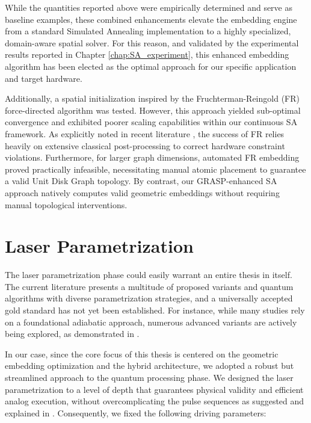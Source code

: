 While the quantities reported above were empirically determined and serve as baseline examples, these combined enhancements elevate the embedding engine from a standard Simulated Annealing implementation to a highly specialized, domain-aware spatial solver. For this reason, and validated by the experimental results reported in Chapter \ref{chap:SA_experiment}, this enhanced embedding algorithm has been elected as the optimal approach for our specific application and target hardware.

Additionally, a spatial initialization inspired by the Fruchterman-Reingold (FR) force-directed algorithm was tested. However, this approach yielded sub-optimal convergence and exhibited poorer scaling capabilities within our continuous SA framework. As explicitly noted in recent literature \cite{tarquini2026dronedeliverypackingproblem}, the success of FR relies heavily on extensive classical post-processing to correct hardware constraint violations. Furthermore, for larger graph dimensions, automated FR embedding proved practically infeasible, necessitating manual atomic placement to guarantee a valid Unit Disk Graph topology. By contrast, our GRASP-enhanced SA approach natively computes valid geometric embeddings without requiring manual topological interventions.

\section{Laser Parametrization}

The laser parametrization phase could easily warrant an entire thesis in itself. The current literature presents a multitude of proposed variants and quantum algorithms with diverse parametrization strategies, and a universally accepted gold standard has not yet been established. For instance, while many studies rely on a foundational adiabatic approach, numerous advanced variants are actively being explored, as demonstrated in \cite{perron2026leveraging}. 

In our case, since the core focus of this thesis is centered on the geometric embedding optimization and the hybrid architecture, we adopted a robust but streamlined approach to the quantum processing phase. We designed the laser parametrization to a level of depth that guarantees physical validity and efficient analog execution, without overcomplicating the pulse sequences as suggested and explained in \cite{pasqal_qubo_qaa}. Consequently, we fixed the following driving parameters: 

